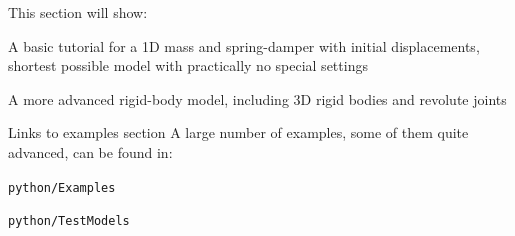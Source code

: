 %
This section will show:
\bi
  \item A basic tutorial for a 1D mass and spring-damper with initial displacements, shortest possible model with practically no special settings
  \item A more advanced rigid-body model, including 3D rigid bodies and revolute joints
  \item Links to examples section
\ei
%
A large number of examples, some of them quite advanced, can be found in:
\bi
  \item[] \texttt{python/Examples}
  \item[] \texttt{python/TestModels}
\ei

